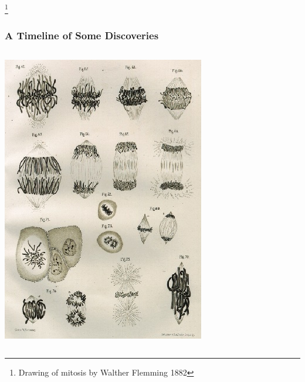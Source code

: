\documentclass{beamer}
\newcommand\blfootnote[1]{%
	\begingroup
	\renewcommand\thefootnote{}\footnote{#1}%
	\addtocounter{footnote}{-1}%
	\endgroup
}
\begin{document}
\begin{frame}
\begin{columns}
\begin{column}{0.6\textwidth}
\begin{itemize}
					\end{itemize}
				\end{column}
				
			\end{columns}
			\blfootnote{Drawing of mitosis by Walther Flemming 1882}
			
			
		\end{frame}
		
		
		
		
		\begin{frame}
			\frametitle{A Timeline of Some Discoveries}
			
			\begin{columns}
				\begin{column}{0.4\textwidth}
					\includegraphics[keepaspectratio, width  =\textwidth]{img/chromosomes}
				\end{column}
				\begin{column}{0.6\textwidth}

\end{column}
\end{columns}
\end{frame}
\end{document}
